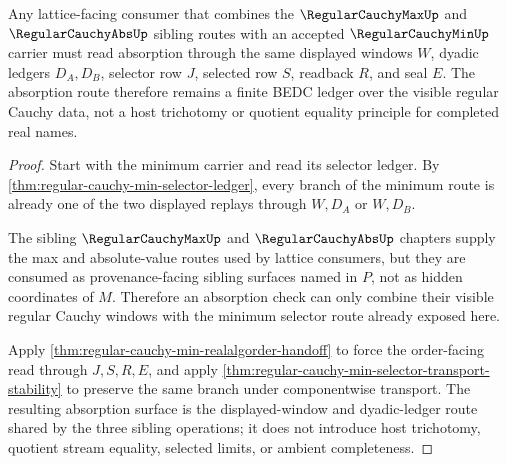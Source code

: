 \begin{theorem}
\label{thm:regular-cauchy-min-lattice-absorption}
Any lattice-facing consumer that combines the $\RegularCauchyMaxUp$ and $\RegularCauchyAbsUp$ sibling routes with an accepted $\RegularCauchyMinUp$ carrier must read absorption through the same displayed windows $W$, dyadic ledgers $D_A,D_B$, selector row $J$, selected row $S$, readback $R$, and seal $E$. The absorption route therefore remains a finite BEDC ledger over the visible regular Cauchy data, not a host trichotomy or quotient equality principle for completed real names.
\end{theorem}
\begin{proof}
Start with the minimum carrier and read its selector ledger. By \autoref{thm:regular-cauchy-min-selector-ledger}, every branch of the minimum route is already one of the two displayed replays through $W,D_A$ or $W,D_B$.

The sibling $\RegularCauchyMaxUp$ and $\RegularCauchyAbsUp$ chapters supply the max and absolute-value routes used by lattice consumers, but they are consumed as provenance-facing sibling surfaces named in $P$, not as hidden coordinates of $M$. Therefore an absorption check can only combine their visible regular Cauchy windows with the minimum selector route already exposed here.

Apply \autoref{thm:regular-cauchy-min-realalgorder-handoff} to force the order-facing read through $J,S,R,E$, and apply \autoref{thm:regular-cauchy-min-selector-transport-stability} to preserve the same branch under componentwise transport. The resulting absorption surface is the displayed-window and dyadic-ledger route shared by the three sibling operations; it does not introduce host trichotomy, quotient stream equality, selected limits, or ambient completeness.
\end{proof}

